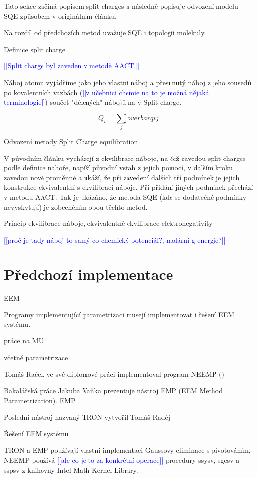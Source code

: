 \documentclass[10pt,draft,oneside]{fithesis2}
\newcommand\todo[1]{\textcolor{blue}{[[#1]]}}
\begin{document}
Tato sekce začíná popisem split charges a následně popisuje odvození modelu SQE způsobem v originálním článku.

Na rozdíl od předchozích metod uvažuje SQE i topologii molekuly.

Definice split charge

\todo{Split charge byl zaveden v metodě AACT.}

Náboj atomu vyjádříme jako jeho vlastní náboj a přesunutý náboj z jeho sousedů po kovalentních vazbách (\todo{v učebnici chemie na to je možná nějaká terminologie}) součet "dělených" nábojů na v Split charge.

\[Q_i = \sum_j overbar qij\]

Odvození metody Split Charge equilibration

V původním článku vycházejí z ekvilibrace náboje, na čež zavedou split charges podle definice nahoře, napíší původní vstah z jejich pomocí, v dalším kroku zavedou nové proměnné a ukáží, že při zavedení dalších tří podmínek je jejich konstrukce ekvivalentní s ekvilibrací náboje. Při přidání jiných podmínek přechází v metodu AACT. Tak je ukázáno, že metoda SQE (kde se dodatečné podmínky nevyskytují) je zobecněním obou těchto metod.

Princip ekvilibrace náboje, ekvivalentně ekvilibrace elektronegativity

\todo{proč je tady náboj to samý co chemický potenciál?, molární g energie?}

\chapter{Předchozí implementace}
EEM

Programy implementující parametrizaci musejí implementovat i řešení EEM systému.

práce na MU

včetně parametrizace

Tomáš Raček ve své diplomové práci implementoval program NEEMP ()

Bakalářská práce Jakuba Vaňka prezentuje nástroj EMP (EEM Method Parametrization). EMP 

Poslední nástroj nazvaný TRON vytvořil Tomáš Raděj.

Řešení EEM systému

TRON a EMP používají vlastní implementaci Gaussovy eliminace s pivotováním, NEEMP používá \todo{ale co je to za konkrétní operace} procedury ssysv, sgesv a sspsv  z knihovny Intel Math Kernel Library.
\end{document}
